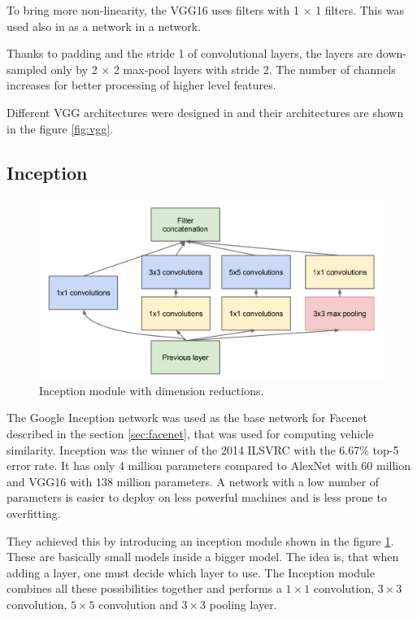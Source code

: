 \documentclass[a4paper,11pt,titlepage,twoside]{article}
\numberwithin{figure}{section}
\begin{document}
To bring more non-linearity, the VGG16 uses filters with 1 $\times$ 1 filters. This was used also in \cite{lecun1989backpropagation} as a network in a network.

Thanks to padding and the stride 1 of convolutional layers, the layers are down-sampled only by 2 $\times$ 2 max-pool layers with stride 2. The number of channels increases for better processing of higher level features. 

Different VGG architectures were designed in \cite{simonyan2014very} and their architectures are shown in the figure \ref{fig:vgg}. 

\subsection{Inception}
\label{sec:inception}

\begin{figure}[h!]
\centering
\includegraphics[width=1\linewidth]{fig/inception.png}
\caption{Inception module \cite{szegedy2015going} with dimension reductions.}
\label{fig:inception-module}
\end{figure}

The Google Inception network \cite{szegedy2015going} was used as the base network for Facenet \cite{schroff2015facenet} described in the section \ref{sec:facenet}, that was used for computing vehicle similarity. Inception was the winner of the 2014 ILSVRC \cite{deng2009imagenet} with the 6.67\% top-5 error rate. It has only 4 million parameters compared to AlexNet \cite{krizhevsky2012imagenet} with 60 million and VGG16 \cite{simonyan2014very} with 138 million parameters. A network with a low number of parameters is easier to deploy on less powerful machines and is less prone to overfitting.

They achieved this by introducing an inception module shown in the figure \ref{fig:inception-module}. These are basically small models inside a bigger model. The idea is, that when adding a layer, one must decide which layer to use. The Inception module combines all these possibilities together and performs a $1 \times 1$ convolution, $3 \times 3$ convolution, $5 \times 5$ convolution and $3 \times 3$ pooling layer.
\end{document}
